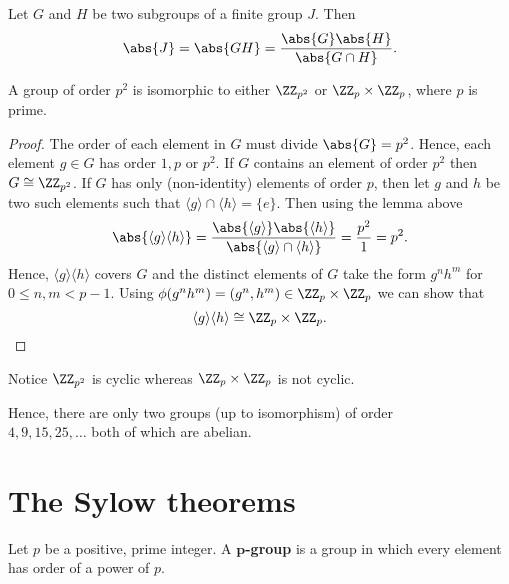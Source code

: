 \documentclass[12pt, a4paper]{article}
\begin{document}
\begin{mdlemma}
    Let \(G\) and \(H\) be two subgroups of a finite group \(J\). Then
    \[\abs{J}=\abs{GH}=\frac{\abs{G}\abs{H}}{\abs{G \cap H}}.\]
\end{mdlemma}

\begin{mdthm}
    A group of order \(p^2\) is isomorphic to either \(\ZZ_{p^2}\) or \(\ZZ_p \times \ZZ_p\), where \(p\) is prime.
\end{mdthm}

\begin{proof}
    The order of each element in \(G\) must divide \(\abs{G}=p^2\). Hence, each element \(g \in G\) has order \(1,p\) or \(p^2\). If \(G\) contains an element of order \(p^2\) then \(G \cong \ZZ_{p^2}\). If \(G\) has only (non-identity) elements of order \(p\), then let \(g\) and \(h\) be two such elements such that \(\langle g \rangle \cap \langle h \rangle =\{e\}\). Then using the lemma above 
    \[\abs{\langle g \rangle \langle h \rangle} = \frac{ \abs{\langle g \rangle} \abs{\langle h \rangle} }{ \abs{\langle g \rangle \cap \langle h \rangle} } =\frac{p^2}{1} =p^2.\]
    Hence, \(\langle g \rangle \langle h \rangle \) covers \(G\) and the distinct elements of \(G\) take the form \(g^n h^m\) for \\ \(0 \leq n,m <p-1\). Using \(\phi(g^n h^m) = (g^n, h^m) \in \ZZ_p \times \ZZ_p\) we can show that 
    \[\langle g \rangle \langle h \rangle \cong \ZZ_p \times \ZZ_p.\]
\end{proof}

\begin{mdremark}
    Notice \(\ZZ_{p^2}\) is cyclic whereas \(\ZZ_p \times \ZZ_p\) is not cyclic.
\end{mdremark}

\begin{mdremark}
    Hence, there are only two groups (up to isomorphism) of order \\ \(4,9,15,25, \ldots \) both of which are abelian.
\end{mdremark}

\pagebreak

\section{The Sylow theorems}

\begin{definition}
    Let \(p\) be a positive, prime integer. A \(\mathbf{p}\)\textbf{-group} is a group in which every element has order of a power of \(p\).
\end{definition}
\end{document}
